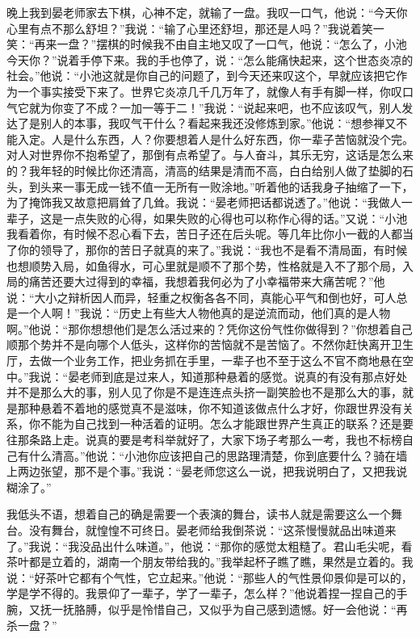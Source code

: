 \documentclass[12pt,oneside]{book}
\begin{document}
晚上我到晏老师家去下棋，心神不定，就输了一盘。我叹一口气，他说：``今天你心里有点不那么舒坦？''我说：``输了心里还舒坦，那还是人吗？''我说着笑一笑：``再来一盘？''摆棋的时候我不由自主地又叹了一口气，他说：``怎么了，小池今天你？''说着手停下来。我的手也停了，说：``怎么能痛快起来，这个世态炎凉的社会。''他说：``小池这就是你自己的问题了，到今天还来叹这个，早就应该把它作为一个事实接受下来了。世界它炎凉几千几万年了，就像人有手有脚一样，你叹口气它就为你变了不成？一加一等于二！''我说：``说起来吧，也不应该叹气，别人发达了是别人的本事，我叹气干什么？看起来我还没修炼到家。''他说：``想参禅又不能入定。人是什么东西，人？你要想着人是什么好东西，你一辈子苦恼就没个完。对人对世界你不抱希望了，那倒有点希望了。与人奋斗，其乐无穷，这话是怎么来的？我年轻的时候比你还清高，清高的结果是清而不高，白白给别人做了垫脚的石头，到头来一事无成一钱不值一无所有一败涂地。''听着他的话我身子抽缩了一下，为了掩饰我又故意把肩耸了几耸。我说：``晏老师把话都说透了。''他说：``我做人一辈子，这是一点失败的心得，如果失败的心得也可以称作心得的话。''又说：``小池我看着你，有时候不忍心看下去，苦日子还在后头呢。等几年比你小一截的人都当了你的领导了，那你的苦日子就真的来了。''我说：``我也不是看不清局面，有时候也想顺势入局，如鱼得水，可心里就是顺不了那个势，性格就是入不了那个局，入局的痛苦还要大过得到的幸福，我想着我何必为了小幸福带来大痛苦呢？''他说：``大小之辩析因人而异，轻重之权衡各各不同，真能心平气和倒也好，可人总是一个人啊！''我说：``历史上有些大人物他真的是逆流而动，他们真的是人物啊。''他说：``那你想想他们是怎么活过来的？凭你这份气性你做得到？''你想着自己顺那个势并不是向哪个人低头，这样你的苦恼就不是苦恼了。不然你赶快离开卫生厅，去做一个业务工作，把业务抓在手里，一辈子也不至于这么不官不商地悬在空中。''我说：``晏老师到底是过来人，知道那种悬着的感觉。说真的有没有那点好处并不是那么大的事，别人见了你是不是连连点头挤一副笑脸也不是那么大的事，就是那种悬着不着地的感觉真不是滋味，你不知道该做点什么才好，你跟世界没有关系，你不能为自己找到一种活着的证明。怎么才能跟世界产生真正的联系？还是要往那条路上走。说真的要是考科举就好了，大家下场子考那么一考，我也不标榜自己有什么清高。''他说：``小池你应该把自己的思路理清楚，你到底要什么？骑在墙上两边张望，那不是个事。''我说：``晏老师您这么一说，把我说明白了，又把我说糊涂了。''

我低头不语，想着自己的确是需要一个表演的舞台，读书人就是需要这么一个舞台。没有舞台，就惶惶不可终日。晏老师给我倒茶说：``这茶慢慢就品出味道来了。''我说：``我没品出什么味道。''，他说：``那你的感觉太粗糙了。君山毛尖呢，看茶叶都是立着的，湖南一个朋友带给我的。''我举起杯子瞧了瞧，果然是立着的。我说：``好茶叶它都有个气性，它立起来。''他说：``那些人的气性景仰景仰是可以的，学是学不得的。我景仰了一辈子，学了一辈子，怎么样？''他说着捏一捏自己的手腕，又抚一抚胳膊，似乎是怜惜自己，又似乎为自己感到遗憾。好一会他说：``再杀一盘？''
\end{document}
